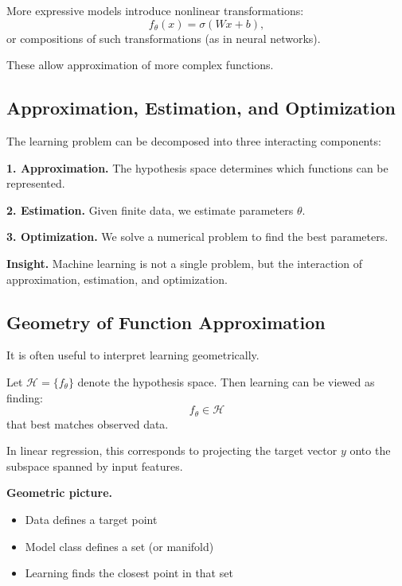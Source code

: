 More expressive models introduce nonlinear transformations:
\[
f_\theta(x) = \sigma(Wx + b),
\]
or compositions of such transformations (as in neural networks).

\medskip

\noindent
These allow approximation of more complex functions.

\subsection{Approximation, Estimation, and Optimization}

The learning problem can be decomposed into three interacting components:

\medskip

\noindent
\textbf{1. Approximation.}  
The hypothesis space determines which functions can be represented.

\medskip

\noindent
\textbf{2. Estimation.}  
Given finite data, we estimate parameters $\theta$.

\medskip

\noindent
\textbf{3. Optimization.}  
We solve a numerical problem to find the best parameters.

\medskip

\noindent
\textbf{Insight.}  
Machine learning is not a single problem, but the interaction of approximation, estimation, and optimization.

\subsection{Geometry of Function Approximation}

It is often useful to interpret learning geometrically.

\medskip

\noindent
Let $\mathcal{H} = \{f_\theta\}$ denote the hypothesis space. Then learning can be viewed as finding:
\[
f_\theta \in \mathcal{H}
\]
that best matches observed data.

\medskip

\noindent
In linear regression, this corresponds to projecting the target vector $y$ onto the subspace spanned by input features.

\medskip

\noindent
\textbf{Geometric picture.}
\begin{itemize}
    \item Data defines a target point
    \item Model class defines a set (or manifold)
    \item Learning finds the closest point in that set
\end{itemize}

